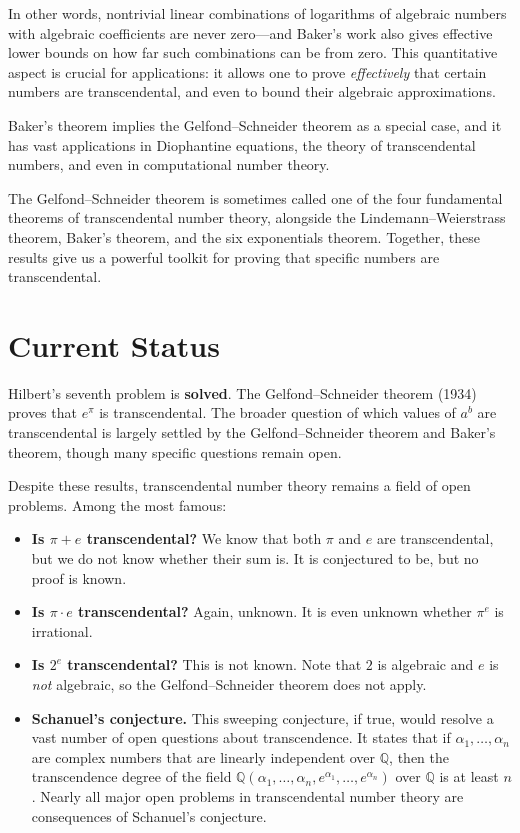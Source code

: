 In other words, nontrivial linear combinations of logarithms of algebraic numbers with algebraic coefficients are never zero---and Baker's work also gives effective lower bounds on how far such combinations can be from zero. This quantitative aspect is crucial for applications: it allows one to prove \emph{effectively} that certain numbers are transcendental, and even to bound their algebraic approximations.

Baker's theorem implies the Gelfond--Schneider theorem as a special case, and it has vast applications in Diophantine equations, the theory of transcendental numbers, and even in computational number theory.

The Gelfond--Schneider theorem is sometimes called one of the four fundamental theorems of transcendental number theory, alongside the Lindemann--Weierstrass theorem, Baker's theorem, and the six exponentials theorem. Together, these results give us a powerful toolkit for proving that specific numbers are transcendental.

\section{Current Status}

\begin{solvedbox}
Hilbert's seventh problem is \textbf{solved}. The Gelfond--Schneider theorem (1934) proves that $e^\pi$ is transcendental. The broader question of which values of $a^b$ are transcendental is largely settled by the Gelfond--Schneider theorem and Baker's theorem, though many specific questions remain open.
\end{solvedbox}

Despite these results, transcendental number theory remains a field of open problems. Among the most famous:

\begin{itemize}
    \item \textbf{Is $\pi + e$ transcendental?} We know that both $\pi$ and $e$ are transcendental, but we do not know whether their sum is. It is conjectured to be, but no proof is known.
    \item \textbf{Is $\pi \cdot e$ transcendental?} Again, unknown. It is even unknown whether $\pi^e$ is irrational.
    \item \textbf{Is $2^e$ transcendental?} This is not known. Note that $2$ is algebraic and $e$ is \emph{not} algebraic, so the Gelfond--Schneider theorem does not apply.
    \item \textbf{Schanuel's conjecture.} This sweeping conjecture, if true, would resolve a vast number of open questions about transcendence. It states that if $\alpha_1, \ldots, \alpha_n$ are complex numbers that are linearly independent over $\mathbb{Q}$, then the transcendence degree of the field $\mathbb{Q}(\alpha_1, \ldots, \alpha_n, e^{\alpha_1}, \ldots, e^{\alpha_n})$ over $\mathbb{Q}$ is at least $n$. Nearly all major open problems in transcendental number theory are consequences of Schanuel's conjecture.
\end{itemize}

